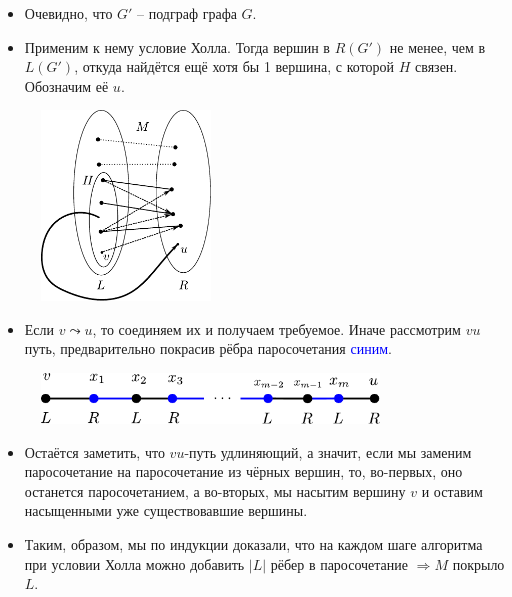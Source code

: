 \begin{frame}[t]
    \begin{itemize}
        \item Очевидно, что $G'$ -- подграф графа $G$.
        \item Применим к нему условие Холла. Тогда вершин в  $R(G')$ не менее, чем в $L(G')$, откуда найдётся ещё хотя бы 1 вершина, с которой $H$ связен. Обозначим её $u$.
    \end{itemize}

            \begin{figure}[h]
                \centering
                \includegraphics[width=0.4\textwidth]{images/connectivity_hall}
                \label{fig:connectivity_hall}
            \end{figure}
    
\end{frame}

\begin{frame}[t]
    \begin{itemize}
        \item Если $v \leadsto u$, то соединяем их и получаем требуемое. Иначе рассмотрим $vu$ путь, предварительно покрасив рёбра паросочетания \textcolor{blue}{синим}.
    \end{itemize}

    \begin{figure}[h]
        \centering
        \includegraphics[width=0.8\textwidth]{images/longerway}
        \label{fig:longerway}
    \end{figure}

    \begin{itemize}
        \item Остаётся заметить, что $vu$-путь удлиняющий, а значит, если мы заменим паросочетание на паросочетание из чёрных вершин, то, во-первых, оно останется паросочетанием, а во-вторых, мы насытим вершину $v$ и оставим насыщенными уже существовавшие вершины.
        \item Таким, образом, мы по индукции доказали, что на каждом шаге алгоритма при условии Холла можно добавить $|L|$ рёбер в паросочетание $ \Rightarrow M$ покрыло $L$. 
            \hfill \qedsymbol{}
    \end{itemize}
\end{frame}
